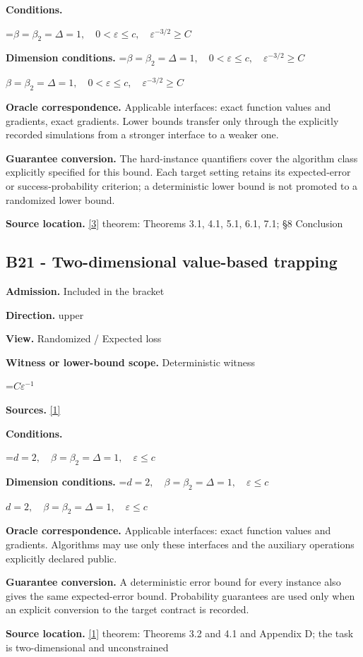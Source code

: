 \documentclass[10pt,a4paper]{article}
\newcommand{\AtlasMath}[1]{\par\begingroup\centering\setbox0=\hbox{$\displaystyle #1$}\ifdim\wd0>1.4\linewidth\typeout{ATLAS WIDE FORMULA: \the\wd0}\fi\ifdim\wd0>\linewidth\resizebox{\linewidth}{!}{\box0}\else\box0\fi\par\endgroup}
\newcommand{\AtlasInlineMath}[1]{\begingroup\setbox0=\hbox{$#1$}\ifdim\wd0>.4\linewidth\endgroup\AtlasMath{#1}\else\endgroup$#1$\fi}
\begin{document}
\textbf{Conditions.} 
\AtlasMath{\beta=\beta_2=\Delta=1,\quad0<\varepsilon\le c,\quad\varepsilon^{-3/2}\ge C}


\textbf{Dimension conditions.} \AtlasInlineMath{\beta=\beta_2=\Delta=1,\quad0<\varepsilon\le c,\quad\varepsilon^{-3/2}\ge C}

\textbf{Oracle correspondence.} Applicable interfaces: exact function values and gradients, exact gradients. Lower bounds transfer only through the explicitly recorded simulations from a stronger interface to a weaker one.

\textbf{Guarantee conversion.} The hard-instance quantifiers cover the algorithm class explicitly specified for this bound. Each target setting retains its expected-error or success-probability criterion; a deterministic lower bound is not promoted to a randomized lower bound.

\textbf{Source location.} \href{https://arxiv.org/abs/2610.16295}{[3]} theorem: Theorems 3.1, 4.1, 5.1, 6.1, 7.1; §8 Conclusion

\subsection{B21 - Two-dimensional value-based trapping}
\textbf{Admission.} Included in the bracket

\textbf{Direction.} upper

\textbf{View.} Randomized / Expected loss

\textbf{Witness or lower-bound scope.} Deterministic witness

\AtlasMath{C\varepsilon^{-1}}
\textbf{Sources.} \href{https://arxiv.org/pdf/2310.09157}{[1]}

\textbf{Conditions.} 
\AtlasMath{d=2,\quad\beta=\beta_2=\Delta=1,\quad\varepsilon\le c}


\textbf{Dimension conditions.} \AtlasInlineMath{d=2,\quad\beta=\beta_2=\Delta=1,\quad\varepsilon\le c}

\textbf{Oracle correspondence.} Applicable interfaces: exact function values and gradients. Algorithms may use only these interfaces and the auxiliary operations explicitly declared public.

\textbf{Guarantee conversion.} A deterministic error bound for every instance also gives the same expected-error bound. Probability guarantees are used only when an explicit conversion to the target contract is recorded.

\textbf{Source location.} \href{https://arxiv.org/pdf/2310.09157}{[1]} theorem: Theorems 3.2 and 4.1 and Appendix D; the task is two-dimensional and unconstrained
\end{document}
